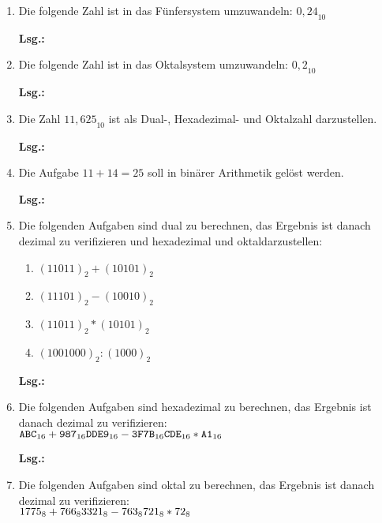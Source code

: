 \documentclass[12pt,a4paper]{scrreprt}
\newcommand{\Lsg}{\par \textbf{Lsg.: \hfill }}
\begin{document}
\begin{enumerate}
\item Die folgende Zahl ist in das Fünfersystem umzuwandeln: ${0,24}_{10}$

\Lsg%

\item Die folgende Zahl ist in das Oktalsystem umzuwandeln: ${0,2}_{10}$

\Lsg%

\item Die Zahl ${11,625}_{10}$ ist als Dual-, Hexadezimal- und Oktalzahl darzustellen.

\Lsg%

\item Die Aufgabe $11+14=25$ soll in binärer Arithmetik gelöst werden.

\Lsg%

\item Die folgenden Aufgaben sind dual zu berechnen, das Ergebnis ist danach dezimal zu verifizieren und hexadezimal und oktaldarzustellen:

\begin{enumerate}
\item $(11011)_2 + (10101)_2$
\item $(11101)_2 - (10010)_2$
\item $(11011)_2 * (10101)_2$
\item $(1001000)_2 : (1000)_2$
\end{enumerate}

\Lsg%

\item Die folgenden Aufgaben sind hexadezimal zu berechnen, das Ergebnis ist danach dezimal zu verifizieren: \\
\begin{math}
\texttt{ABC}_{16} + \texttt{987}_{16}   \\
\texttt{DDE9}_{16} - \texttt{3F7B}_{16} \\
\texttt{CDE}_{16} * \texttt{A1}_{16}
\end{math}

\Lsg%

\item Die folgenden Aufgaben sind oktal zu berechnen, das Ergebnis ist danach dezimal zu verifizieren: \\
\begin{math}
{1775}_8 + {766}_8 \\
{3321}_8 - {763}_8 \\
{721}_8 * {72}_8
\end{math}


\end{enumerate}
\end{document}
